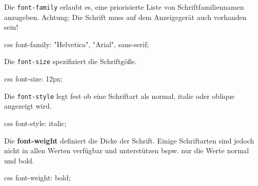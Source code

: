 \documentclass[10pt,a4paper]{article}
\begin{document}
\begin{multicols}{3}
Die \texttt{font-family} erlaubt es, eine priorisierte Liste von Schriftfamiliennamen anzugeben. Achtung: Die Schrift muss auf dem Anzeigegerät auch vorhanden sein!
\begin{codebox}{css}{}
font-family: "Helvetica", "Arial", sans-serif;
\end{codebox}

Die \texttt{font-size} spezifiziert die Schriftgöße.
\begin{codebox}{css}{}
font-size: 12px;
\end{codebox}

Die \texttt{font-style} legt fest ob eine Schriftart als normal, italic oder oblique angezeigt wird.
\begin{codebox}{css}{}
font-style: italic;
\end{codebox}

Die \textbf{font-weight} definiert die Dicke der Schrift. Einige Schriftarten sind jedoch nicht in allen Werten verfügbar und unterstützen bspw. nur die Werte normal und bold.
\begin{codebox}{css}{}
font-weight: bold;
\end{codebox}




\printbibliography
{}
\end{multicols}
\end{document}
